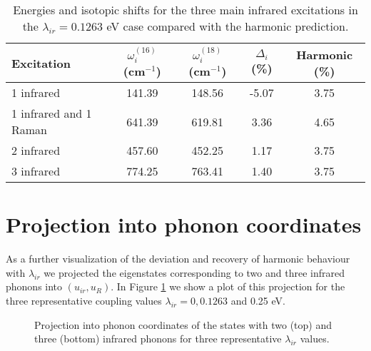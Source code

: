 
\begin{table}[ht]
  \centering
  \begin{tabular}[ht]{|l|c|c|c|c|}
    \hline
    Excitation & $\omega_i^{(16)}$ (cm$^{-1}$) & $\omega_i^{(18)}$ (cm$^{-1}$) & $\Delta_i$ (\%) & Harmonic (\%)\\
    \hline
    1 infrared              & 141.39 & 148.56 & -5.07 & 3.75 \\
    1 infrared and 1 Raman  & 641.39 & 619.81 &  3.36 & 4.65 \\
    2 infrared              & 457.60 & 452.25 &  1.17 & 3.75 \\
    3 infrared              & 774.25 & 763.41 &  1.40 & 3.75 \\
    \hline
    \end{tabular}
    \caption[Energies and isotopic shifts for the infrared excitations in the $\lambda_{ir}=0.1263$ eV case.]
    {Energies and isotopic shifts for the three main infrared excitations in the $\lambda_{ir}=0.1263$ eV case compared with the harmonic prediction.}
    \label{tab:irIsotShifts}
\end{table}

\section{Projection into phonon coordinates}
\label{sec:irPhononProj}

As a further visualization of the deviation and recovery of harmonic behaviour with $\lambda_{ir}$ we projected the eigenstates corresponding to two and three infrared phonons into $(u_{ir},u_R)$.
In Figure \ref{fig:phononProj2-3ir} we show a plot of this projection for the three representative coupling values $\lambda_{ir}=0,0.1263$ and 0.25 eV.

\begin{figure}[ht]
  \centering
  
  \caption[Projection into phonon coordinates of the states with two and three infrared phonons.]
  {Projection into phonon coordinates of the states with two (top) and three (bottom) infrared phonons for three representative $\lambda_{ir}$ values.}
  \label{fig:phononProj2-3ir}
\end{figure}

